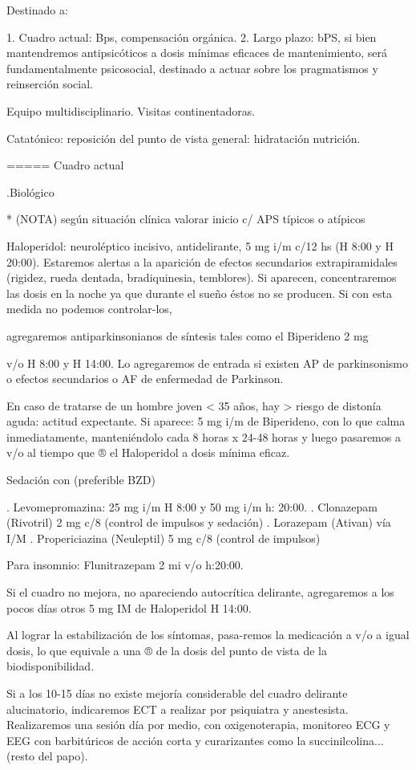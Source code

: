 Destinado a:

1. Cuadro actual: Bps, compensación orgánica.
2. Largo plazo: bPS, si bien mantendremos antipsicóticos a dosis mínimas eficaces de mantenimiento, será fundamentalmente psicosocial, destinado a actuar sobre los pragmatismos y reinserción social.

Equipo multidisciplinario. Visitas continentadoras.

Catatónico: reposición del punto de vista general: hidratación nutrición.

===== Cuadro actual

.Biológico

* (NOTA) según situación clínica valorar inicio c/ APS típicos o atípicos

Haloperidol: neuroléptico incisivo, antidelirante, 5 mg i/m c/12 hs (H 8:00 y H 20:00). Estaremos alertas a la aparición de efectos secundarios extrapiramidales (rigidez, rueda dentada, bradiquinesia, temblores). Si aparecen, concentraremos las dosis en la noche ya que durante el sueño éstos no se producen. Si con esta medida no podemos controlar-los,

agregaremos antiparkinsonianos de síntesis tales como el Biperideno 2 mg

v/o H 8:00 y H 14:00. Lo agregaremos de entrada si existen AP de parkinsonismo o efectos secundarios o AF de enfermedad de Parkinson.

En caso de tratarse de un hombre joven < 35 años, hay > riesgo de distonía aguda: actitud expectante. Si aparece: 5 mg i/m de Biperideno, con lo que calma inmediatamente, manteniéndolo cada 8 horas x 24-48 horas y luego pasaremos a v/o al tiempo que ® el Haloperidol a dosis mínima eficaz.

Sedación con (preferible BZD)

. Levomepromazina: 25 mg i/m H 8:00 y 50 mg i/m h: 20:00.
. Clonazepam (Rivotril) 2 mg c/8 (control de impulsos y sedación)
. Lorazepam (Ativan) vía I/M
. Propericiazina (Neuleptil) 5 mg c/8 (control de impulsos)

Para insomnio: Flunitrazepam 2 mi v/o h:20:00.

Si el cuadro no mejora, no apareciendo autocrítica delirante, agregaremos a los pocos días otros 5 mg IM de Haloperidol H 14:00.

Al lograr la estabilización de los síntomas, pasa-remos la medicación a v/o a igual dosis, lo que equivale a una ® de la dosis del punto de vista de la biodisponibilidad.

Si a los 10-15 días no existe mejoría considerable del cuadro delirante alucinatorio, indicaremos ECT a realizar por psiquiatra y anestesista. Realizaremos una sesión día por medio, con oxigenoterapia, monitoreo ECG y EEG con barbitúricos de acción corta y curarizantes como la succinilcolina... (resto del papo).


